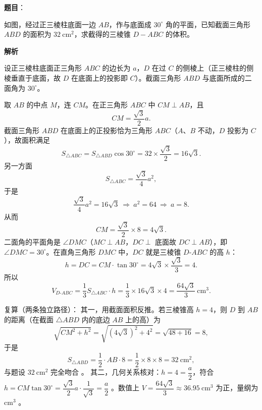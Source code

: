 \begin{answer}

\textbf{题目}：

如图，经过正三棱柱底面一边 $AB$，作与底面成 $30^\circ$ 角的平面，已知截面三角形 $ABD$ 的面积为 $32\ \mathrm{cm}^2$，求截得的三棱锥 $D-ABC$ 的体积。
\nopagebreak[4]
\begin{center}\end{center}
\nopagebreak[4]
\textbf{解析}
\nopagebreak[4]
\begin{center}\end{center}
\nopagebreak[4]
设正三棱柱底面正三角形 $ABC$ 的边长为 $a$，$D$ 在过 $C$ 的侧棱上（正三棱柱的侧棱垂直于底面，故 $D$ 在底面上的投影即 $C$）。截面三角形 $ABD$ 与底面所成的二面角为 $30^\circ$。

取 $AB$ 的中点 $M$，连 $CM$。在正三角形 $ABC$ 中 $CM\perp AB$，且
\nopagebreak[4]
\[
CM=\frac{\sqrt3}{2}a.
\]
截面三角形 $ABD$ 在底面上的正投影恰为三角形 $ABC$（$A$、$B$ 不动，$D$ 投影为 $C$），故面积满足
\nopagebreak[4]
\[
S_{\triangle ABC}=S_{\triangle ABD}\cos30^\circ=32\times\frac{\sqrt3}{2}=16\sqrt3.
\]
另一方面
\nopagebreak[4]
\[
S_{\triangle ABC}=\frac{\sqrt3}{4}a^2,
\]
于是
\nopagebreak[4]
\[
\frac{\sqrt3}{4}a^2=16\sqrt3\ \Longrightarrow\ a^2=64\ \Longrightarrow\ a=8.
\]
从而
\nopagebreak[4]
\[
CM=\frac{\sqrt3}{2}\times8=4\sqrt3.
\]
二面角的平面角是 $\angle DMC$（$MC\perp AB$，$DC\perp$ 底面故 $DC\perp AB$），即 $\angle DMC=30^\circ$。在直角三角形 $DMC$ 中，$DC$ 就是三棱锥 $D\text{-}ABC$ 的高 $h$：
\nopagebreak[4]
\[
h=DC=CM\cdot\tan30^\circ=4\sqrt3\times\frac{\sqrt3}{3}=4.
\]
所以
\nopagebreak[4]
\[
V_{D\text{-}ABC}=\frac13 S_{\triangle ABC}\cdot h=\frac13\times16\sqrt3\times4=\frac{64\sqrt3}{3}\ \mathrm{cm}^3.
\]

复算（两条独立路径）：
其一，用截面面积反推。若三棱锥高 $h=4$，则 $D$ 到 $AB$ 的距离（在截面 $\triangle ABD$ 内的底边 $AB$ 上的高）为
\nopagebreak[4]
\[
\sqrt{CM^2+h^2}=\sqrt{(4\sqrt3)^2+4^2}=\sqrt{48+16}=8,
\]
于是
\nopagebreak[4]
\[
S_{\triangle ABD}=\frac12\cdot AB\cdot 8=\frac12\times8\times8=32\ \mathrm{cm}^2,
\]
与题设 $32\ \mathrm{cm}^2$ 完全吻合 。
其二，几何关系核对：$h=4=\dfrac a2$，符合 $h=CM\tan30^\circ=\dfrac{\sqrt3}{2}a\cdot\dfrac1{\sqrt3}=\dfrac a2$ 。数值上 $V=\dfrac{64\sqrt3}{3}\approx36.95\ \mathrm{cm}^3$ 为正，量纲为 $\mathrm{cm}^3$ 。


\end{answer}
